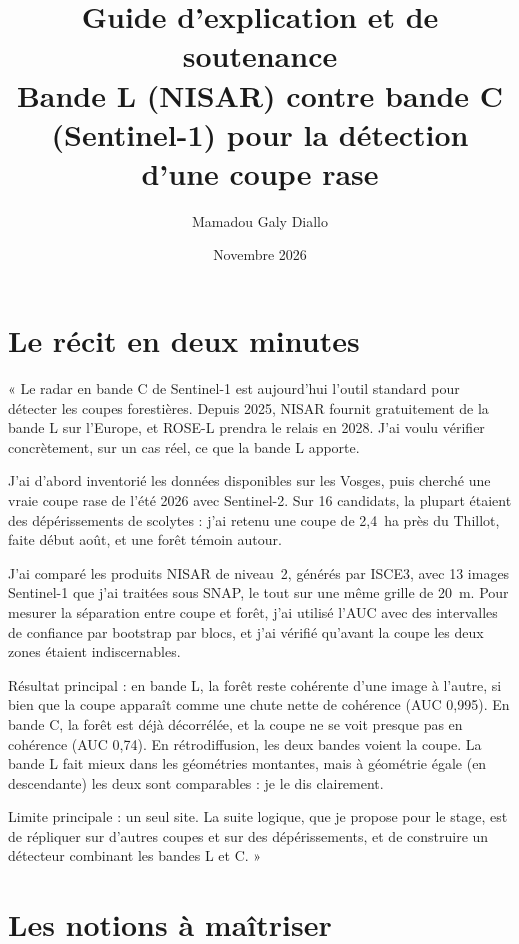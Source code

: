 \documentclass[11pt,a4paper]{article}
\title{Guide d'explication et de soutenance\\[0.3em]\large Bande L (NISAR) contre bande C (Sentinel-1) pour la détection d'une coupe rase}
\author{Mamadou Galy Diallo}
\date{Novembre 2026}
\begin{document}
\maketitle
\tableofcontents

\section{Le récit en deux minutes}

\begin{dire}
« Le radar en bande C de Sentinel-1 est aujourd'hui l'outil standard pour détecter les coupes forestières. Depuis 2025,
NISAR fournit gratuitement de la bande L sur l'Europe, et ROSE-L prendra le relais en 2028. J'ai voulu vérifier
concrètement, sur un cas réel, ce que la bande L apporte.

J'ai d'abord inventorié les données disponibles sur les Vosges, puis cherché une vraie coupe rase de l'été 2026 avec
Sentinel-2. Sur 16 candidats, la plupart étaient des dépérissements de scolytes : j'ai retenu une coupe de 2,4~ha
près du Thillot, faite début août, et une forêt témoin autour.

J'ai comparé les produits NISAR de niveau~2, générés par ISCE3, avec 13 images Sentinel-1 que j'ai traitées sous SNAP,
le tout sur une même grille de 20~m. Pour mesurer la séparation entre coupe et forêt, j'ai utilisé l'AUC avec des
intervalles de confiance par bootstrap par blocs, et j'ai vérifié qu'avant la coupe les deux zones étaient
indiscernables.

Résultat principal : en bande L, la forêt reste cohérente d'une image à l'autre, si bien que la coupe apparaît comme
une chute nette de cohérence (AUC 0,995). En bande C, la forêt est déjà décorrélée, et la coupe ne se voit presque pas
en cohérence (AUC 0,74). En rétrodiffusion, les deux bandes voient la coupe. La bande L fait mieux dans les
géométries montantes, mais à géométrie égale (en descendante) les deux sont comparables : je le dis clairement.

Limite principale : un seul site. La suite logique, que je propose pour le stage, est de répliquer sur d'autres coupes
et sur des dépérissements, et de construire un détecteur combinant les bandes L et C. »
\end{dire}

\section{Les notions à maîtriser}
\end{document}
